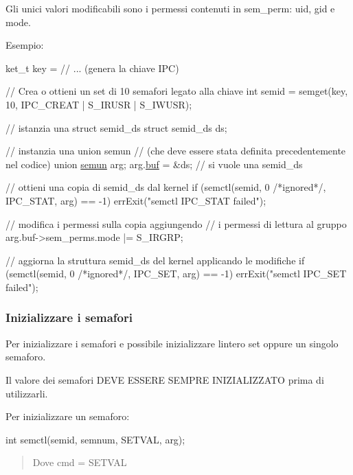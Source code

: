 Gli unici valori modificabili sono i permessi contenuti in {\ttfamily sem\+\_\+perm}\+: {\ttfamily uid}, {\ttfamily gid} e {\ttfamily mode}.

Esempio\+: 
\begin{DoxyCode}
ket\_t key = \textcolor{comment}{// ... (genera la chiave IPC)}

\textcolor{comment}{// Crea o ottieni un set di 10 semafori legato alla chiave}
\textcolor{keywordtype}{int} semid = semget(key, 10, IPC\_CREAT | S\_IRUSR | S\_IWUSR);

\textcolor{comment}{// istanzia una struct semid\_ds}
\textcolor{keyword}{struct }semid\_ds ds;

\textcolor{comment}{// instanzia una union semun}
\textcolor{comment}{// (che deve essere stata definita precedentemente nel codice)}
\textcolor{keyword}{union }\hyperlink{unionsemun}{semun} arg;
arg.\hyperlink{unionsemun_ac6b6428d07d4147fd2cc698b53555bed}{buf} = &ds;  \textcolor{comment}{// si vuole una semid\_ds}

\textcolor{comment}{// ottieni una copia di semid\_ds dal kernel}
\textcolor{keywordflow}{if} (semctl(semid, 0 \textcolor{comment}{/*ignored*/}, IPC\_STAT, arg) == -1)
    errExit(\textcolor{stringliteral}{"semctl IPC\_STAT failed"});

\textcolor{comment}{// modifica i permessi sulla copia aggiungendo}
\textcolor{comment}{// i permessi di lettura al gruppo}
arg.buf->sem\_perms.mode |= S\_IRGRP;

\textcolor{comment}{// aggiorna la struttura semid\_ds del kernel applicando le modifiche}
\textcolor{keywordflow}{if} (semctl(semid, 0 \textcolor{comment}{/*ignored*/}, IPC\_SET, arg) == -1)
    errExit(\textcolor{stringliteral}{"semctl IPC\_SET failed"});
\end{DoxyCode}


\subsubsection*{Inizializzare i semafori}

Per inizializzare i semafori e\textquotesingle{} possibile inizializzare l\textquotesingle{}intero set oppure un singolo semaforo.

Il valore dei semafori D\+E\+VE E\+S\+S\+E\+RE S\+E\+M\+P\+RE I\+N\+I\+Z\+I\+A\+L\+I\+Z\+Z\+A\+TO prima di utilizzarli.

Per inizializzare un semaforo\+: 
\begin{DoxyCode}
\textcolor{keywordtype}{int} semctl(semid, semnum, SETVAL, arg);
\end{DoxyCode}
 \begin{quote}
Dove {\ttfamily cmd} = {\ttfamily S\+E\+T\+V\+AL} \end{quote}


